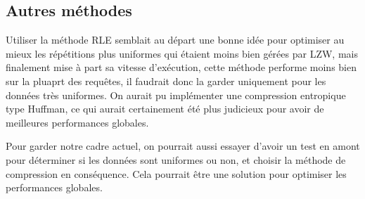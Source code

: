 \documentclass{article}[letterpaper, 11pt]
\begin{document}
\subsection{Autres méthodes}
Utiliser la méthode RLE semblait au départ une bonne idée pour optimiser au mieux les répétitions plus uniformes qui étaient moins bien gérées par LZW, mais finalement mise à part sa vitesse d'exécution, cette méthode performe moins bien sur la pluaprt des requêtes, il faudrait donc la garder uniquement pour les données très uniformes. On aurait pu implémenter une compression entropique type Huffman, ce qui aurait certainement été plus judicieux pour avoir de meilleures performances globales.

Pour garder notre cadre actuel, on pourrait aussi essayer d'avoir un test en amont pour déterminer si les données sont uniformes ou non, et choisir la méthode de compression en conséquence. Cela pourrait être une solution pour optimiser les performances globales.





\end{document}
